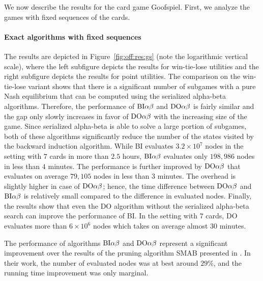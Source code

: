 We now describe the results for the card game Goofspiel.
First, we analyze the games with fixed sequences of the cards.

\paragraph{Exact algorithms with fixed sequences}
The results are depicted in Figure~\ref{fig:off:res:gs} (note the logarithmic vertical scale), where the left subfigure depicts the results for win-tie-lose utilities and the right subfigure depicts the results for point utilities.
The comparison on the win-tie-lose variant shows that there is a significant number of subgames with a pure Nash equilibrium that can be computed using the serialized alpha-beta algorithms.
Therefore, the performance of $\textrm{BI}\alpha\beta$ and $\textrm{DO}\alpha\beta$ is fairly similar and the gap only slowly increases in favor of $\textrm{DO}\alpha\beta$ with the increasing size of the game.
Since serialized alpha-beta is able to solve a large portion of subgames, both of these algorithms significantly reduce the number of the states visited by the backward induction algorithm.
While \textsc{BI} evaluates $3.2\times10^7$ nodes in the setting with $7$ cards in more than $2.5$ hours, $\textrm{BI}\alpha\beta$ evaluates only $198,986$ nodes in less than $4$ minutes.
The performance is further improved by $\textrm{DO}\alpha\beta$ that evaluates on average $79,105$ nodes in less than $3$ minutes.
The overhead is slightly higher in case of $\textrm{DO}\alpha\beta$; hence, the time difference between $\textrm{DO}\alpha\beta$ and $\textrm{BI}\alpha\beta$ is relatively small compared to the difference in evaluated nodes.
Finally, the results show that even the \textsc{DO} algorithm without the serialized alpha-beta search can improve the performance of \textsc{BI}.
In the setting with $7$ cards, \textsc{DO} evaluates more than $6\times10^6$ nodes which takes on average almost 30 minutes.


The performance of algorithms $\textrm{BI}\alpha\beta$ and $\textrm{DO}\alpha\beta$ represent a significant improvement over the results of the pruning algorithm
SMAB presented in \cite{Saffidine12SMAB}.
In their work, the number of evaluated nodes was at best around $29\%$, and the running time improvement was only marginal.

